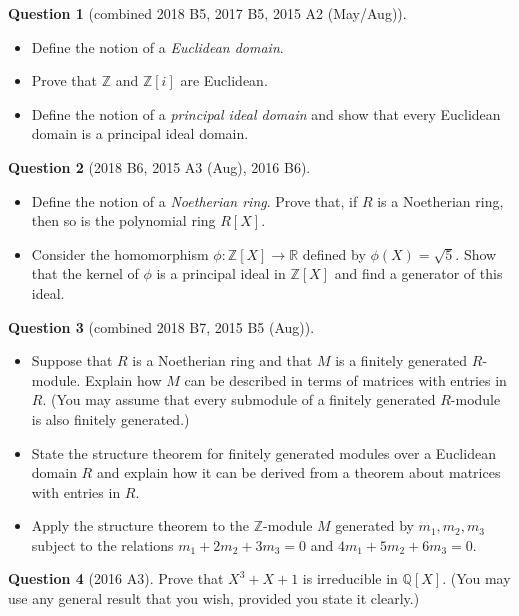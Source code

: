 \documentclass{article}
\numberwithin{equation}{section}
\theoremstyle{definition}
\newtheorem{quest}{Question}
\newcommand{\Z}{\mathbb{Z}}
\newcommand{\Q}{\mathbb{Q}}
\newcommand{\R}{\mathbb{R}}
\renewcommand{\.}{\,.}
\begin{document}

\begin{quest}[combined 2018 B5, 2017 B5, 2015 A2 (May/Aug)]

\begin{itemize}
\item Define the notion of a \textit{Euclidean domain}.
\item Prove that $\Z$ and $\Z[i]$ are Euclidean.
\item Define the notion of a \textit{principal ideal domain} and show that every Euclidean domain is a principal ideal domain.
\end{itemize}
\end{quest}

\begin{quest}[2018 B6, 2015 A3 (Aug), 2016 B6]

\begin{itemize}
\item Define the notion of a \textit{Noetherian ring}. Prove that, if $R$ is a Noetherian ring, then so is the polynomial ring $R[X]$.
\item Consider the homomorphism $\phi : \Z[X] \to \R$ defined by $\phi(X)=\sqrt{5}$. Show that the kernel of $\phi$ is a principal ideal in $\Z[X]$ and find a generator of this ideal.
\end{itemize}
\end{quest}


\begin{quest}[combined 2018 B7, 2015 B5 (Aug)]

\begin{itemize}
\item Suppose that $R$ is a Noetherian ring and that $M$ is a finitely generated $R$-module. Explain how $M$ can be described in terms of matrices with entries in $R$. (You may assume that every submodule of a finitely generated $R$-module is also finitely generated.)
\item State the structure theorem for finitely generated modules over a Euclidean domain $R$ and explain how it can be derived from a theorem about matrices with entries in $R$.
\item Apply the structure theorem to the $\Z$-module $M$ generated by $m_1, m_2, m_3$ subject to the relations $m_1+2m_2+3m_3=0$ and $4m_1+5m_2+6m_3=0$.
\end{itemize}
\end{quest}

\begin{quest}[2016 A3]
Prove that $X^3+X+1$ is irreducible in $\Q[X]$. (You may use any general result that you wish, provided you state it clearly.)
\end{quest}
\end{document}
